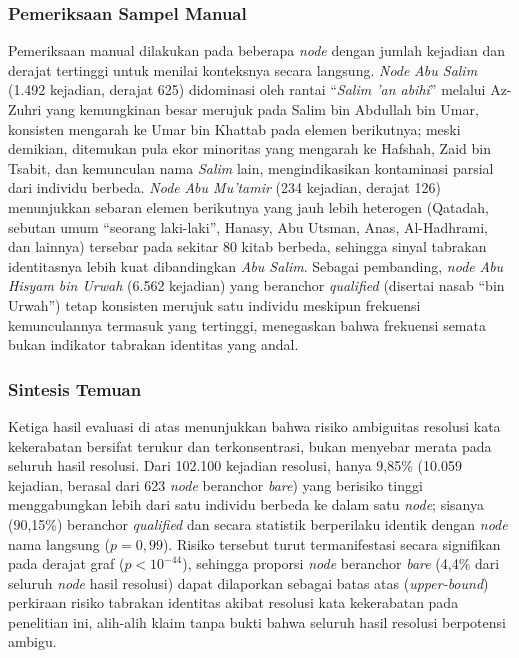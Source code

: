 \subsubsection{Pemeriksaan Sampel Manual}
Pemeriksaan manual dilakukan pada beberapa \textit{node} dengan jumlah kejadian dan derajat tertinggi untuk menilai konteksnya secara langsung. \textit{Node} \textit{Abu Salim} (1.492 kejadian, derajat 625) didominasi oleh rantai ``\textit{Salim 'an abihi}'' melalui Az-Zuhri yang kemungkinan besar merujuk pada Salim bin Abdullah bin Umar, konsisten mengarah ke Umar bin Khattab pada elemen berikutnya; meski demikian, ditemukan pula ekor minoritas yang mengarah ke Hafshah, Zaid bin Tsabit, dan kemunculan nama \textit{Salim} lain, mengindikasikan kontaminasi parsial dari individu berbeda. \textit{Node} \textit{Abu Mu'tamir} (234 kejadian, derajat 126) menunjukkan sebaran elemen berikutnya yang jauh lebih heterogen (Qatadah, sebutan umum ``seorang laki-laki'', Hanasy, Abu Utsman, Anas, Al-Hadhrami, dan lainnya) tersebar pada sekitar 80 kitab berbeda, sehingga sinyal tabrakan identitasnya lebih kuat dibandingkan \textit{Abu Salim}. Sebagai pembanding, \textit{node} \textit{Abu Hisyam bin Urwah} (6.562 kejadian) yang beranchor \textit{qualified} (disertai nasab ``bin Urwah'') tetap konsisten merujuk satu individu meskipun frekuensi kemunculannya termasuk yang tertinggi, menegaskan bahwa frekuensi semata bukan indikator tabrakan identitas yang andal.

\subsubsection{Sintesis Temuan}
Ketiga hasil evaluasi di atas menunjukkan bahwa risiko ambiguitas resolusi kata kekerabatan bersifat terukur dan terkonsentrasi, bukan menyebar merata pada seluruh hasil resolusi. Dari 102.100 kejadian resolusi, hanya 9,85\% (10.059 kejadian, berasal dari 623 \textit{node} beranchor \textit{bare}) yang berisiko tinggi menggabungkan lebih dari satu individu berbeda ke dalam satu \textit{node}; sisanya (90,15\%) beranchor \textit{qualified} dan secara statistik berperilaku identik dengan \textit{node} nama langsung ($p=0,99$). Risiko tersebut turut termanifestasi secara signifikan pada derajat graf ($p<10^{-44}$), sehingga proporsi \textit{node} beranchor \textit{bare} (4,4\% dari seluruh \textit{node} hasil resolusi) dapat dilaporkan sebagai batas atas (\textit{upper-bound}) perkiraan risiko tabrakan identitas akibat resolusi kata kekerabatan pada penelitian ini, alih-alih klaim tanpa bukti bahwa seluruh hasil resolusi berpotensi ambigu.

